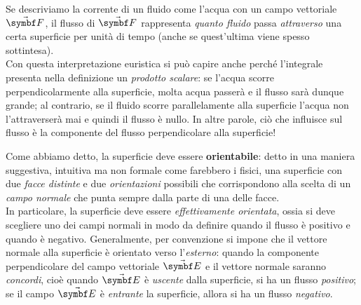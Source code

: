 \begin{intuit}
	Se descriviamo la corrente di un fluido come l'acqua con un campo vettoriale $\vba{F}$, il flusso di $\vba{F}$ rappresenta \textit{quanto fluido} passa \textit{attraverso} una certa superficie per unità di tempo (anche se quest'ultima viene spesso sottintesa).\\
	Con questa interpretazione euristica si può capire anche perché l'integrale presenta nella definizione un \textit{prodotto scalare}: se l'acqua scorre perpendicolarmente alla superficie, molta acqua passerà e il flusso sarà dunque grande; al contrario, se il fluido scorre parallelamente alla superficie l'acqua non l'attraverserà mai e quindi il flusso è nullo. In altre parole, ciò che influisce sul flusso è la componente del flusso perpendicolare alla superficie!
\end{intuit}
\noindent Come abbiamo detto, la superficie deve essere \textbf{orientabile}: detto in una maniera suggestiva, intuitiva ma non formale come farebbero i fisici, una superficie con due \textit{facce distinte} e due \textit{orientazioni} possibili che corrispondono alla scelta di un \textit{campo normale} che punta sempre dalla parte di una delle facce.\\
In particolare, la superficie deve essere \textit{effettivamente orientata}, ossia si deve scegliere uno dei campi normali in modo da definire quando il flusso è positivo e quando è negativo. Generalmente, per convenzione si impone che il vettore normale alla superficie è orientato verso l'\textit{esterno}: quando la componente perpendicolare del campo vettoriale $\vba{E}$ e il vettore normale saranno \textit{concordi}, cioè quando $\vba{E}$ è \textit{uscente} dalla superficie, si ha un flusso \textit{positivo}; se il campo $\vba{E}$ è \textit{entrante} la superficie, allora si ha un flusso \textit{negativo}.
